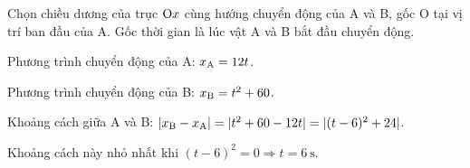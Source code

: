 \begin{enumerate}[label=\bfseries Câu \arabic*:]
{		Chọn chiều dương của trục $\text O x$ cùng hướng chuyển động của A và B, gốc O tại vị trí ban đầu của A. Gốc thời gian là lúc vật A và B bắt đầu chuyển động.
		
		Phương trình chuyển động của A: $x_\text A = 12t$.
		
		Phương trình chuyển động của B: $x_\text B = t^2 + 60$.
		
		Khoảng cách giữa A và B: $|x_\text B - x_\text A |=|t^2+60-12t|=|(t-6)^2+24|$.
		
		Khoảng cách này nhỏ nhất khi $(t-6)^2 = 0 \Rightarrow t=\SI{6}{\second}$.
		
		
	}
\end{enumerate}

\whiteBGstarEnd

